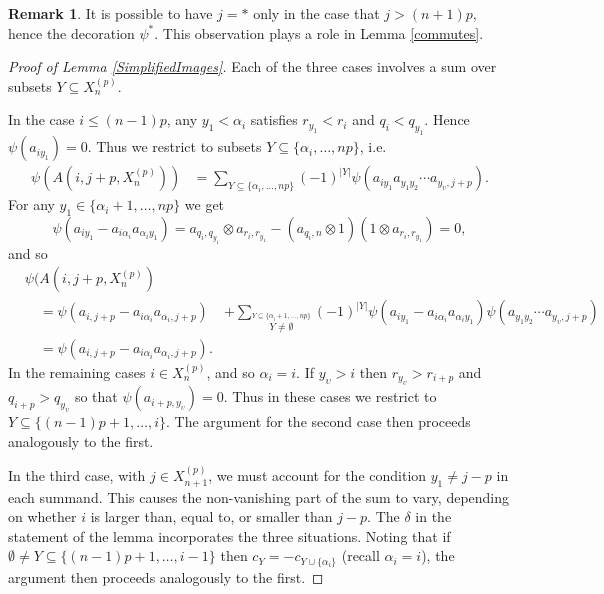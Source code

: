 \documentclass[11pt]{amsart}
\def\a{\alpha}
\def\u{\upsilon}
\theoremstyle{definition}
\newtheorem{rem}[thm]{Remark}
\begin{document}
\begin{rem}It is possible to have $j=\ast$ only in the case that $j>(n+1)p$, hence the decoration $\psi^\ast$. This observation plays a role in Lemma \ref{commutes}.
\end{rem}
\begin{proof}[Proof of Lemma \ref{SimplifiedImages}] Each of the three cases involves a sum over subsets $Y\subseteq X_n^{(p)}$. 

In the case $i\le(n-1)p$, any $y_1<\a_i$ satisfies $r_{y_1}<r_i$ and $q_i<q_{y_1}$. Hence $\psi(a_{iy_1})=0$. Thus we restrict to subsets $Y\subseteq\{\a_i,\ldots,np\}$, i.e.
        \begin{align*}
        \psi(A(i,j+p,X_n^{(p)}))  &= \sum_{Y\subseteq \{\a_i,\ldots,np\}}(-1)^{|Y|}\psi(a_{iy_1}a_{y_1y_2}\cdots a_{y_\u,j+p}).
        \end{align*}
For any $y_1\in\{\a_i+1,\ldots,np\}$ we get 
{\small
  \[\psi(a_{iy_1}-a_{i\a_i}a_{\a_iy_1}) = a_{q_i,q_{y_1}}\otimes a_{r_i,r_{y_1}}-(a_{q_i,n}\otimes 1)(1\otimes a_{r_i,r_{y_1}}) = 0,\]
}
\noindent and so 
{\small
        \begin{align*}
          &\psi(A(i,j+p,X_n^{(p)})                  & \\
          &\quad =\psi(a_{i,j+p}-a_{i\a_i}a_{\a_i,j+p}) &+\sum_{{\scriptscriptstyle \overset{Y\subseteq \{\a_i+1,\ldots,np\}}{Y\ne\emptyset}}}(-1)^{|Y|}\psi(a_{iy_1}-a_{i\a_i}a_{\a_iy_1})\psi(a_{y_1y_2}\cdots a_{y_\u,j+p})\\
          &\quad =\psi(a_{i,j+p}-a_{i\a_i}a_{\a_i,j+p}).
        \end{align*}
}
In the remaining cases $i\in X_n^{(p)}$, and so $\a_i=i$. If $y_\u>i$ then $r_{y_\u}>r_{i+p}$ and $q_{i+p}>q_{y_\u}$ so that $\psi(a_{i+p,y_\u})=0$. Thus in these cases we restrict to $Y\subseteq\{(n-1)p+1,\ldots,i\}$. The argument for the second case then proceeds analogously to the first.

In the third case, with $j\in X_{n+1}^{(p)}$, we must account for the condition $y_1\ne j-p$ in each summand. This causes the non-vanishing part of the sum to vary, depending on whether $i$ is larger than, equal to, or smaller than $j-p$. The $\delta$ in the statement of the lemma incorporates the three situations.  Noting that if $\emptyset \ne Y\subseteq\{(n-1)p+1,\ldots,i-1\}$ then $c_Y = -c_{Y\cup \{\a_i\}}$ (recall $\a_i=i$), the argument then proceeds analogously to the first.
\end{proof}
\end{document}
